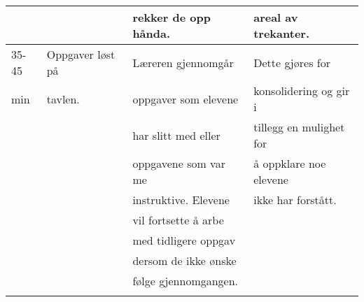 \documentclass{article}
\begin{document}
\begin{center}
\begin{tabular}{l|l|l|l}
 &  & rekker de opp hånda. & areal av trekanter.\\
\hline
35-45 & Oppgaver løst på & Læreren gjennomgår & Dette gjøres for\\
min & tavlen. & oppgaver som elevene & konsolidering og gir i\\
 &  & har slitt med eller & tillegg en mulighet for\\
 &  & oppgavene som var me & å oppklare noe elevene\\
 &  & instruktive. Elevene & ikke har forstått.\\
 &  & vil fortsette å arbe & \\
 &  & med tidligere oppgav & \\
 &  & dersom de ikke ønske & \\
 &  & følge gjennomgangen. & \\
 &  &  & \\
\end{tabular}
\end{center}
%
%
%
%
\end{document}
